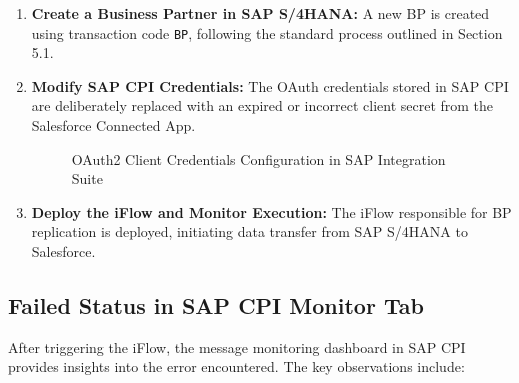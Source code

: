 \begin{enumerate}
    \item \textbf{Create a Business Partner in SAP S/4HANA:}  
    A new BP is created using transaction code \texttt{BP}, following the standard process outlined in Section 5.1.
    
    \item \textbf{Modify SAP CPI Credentials:}  
    The OAuth credentials stored in SAP CPI are deliberately replaced with an expired or incorrect client secret from the Salesforce Connected App.

    \begin{figure}[H]
    \centering
    \caption{OAuth2 Client Credentials Configuration in SAP Integration Suite}
    
    \end{figure}
    
    \item \textbf{Deploy the iFlow and Monitor Execution:}  
    The iFlow responsible for BP replication is deployed, initiating data transfer from SAP S/4HANA to Salesforce.
\end{enumerate}

\subsection{Failed Status in SAP CPI Monitor Tab}
After triggering the iFlow, the message monitoring dashboard in SAP CPI provides insights into the error encountered. The key observations include:

